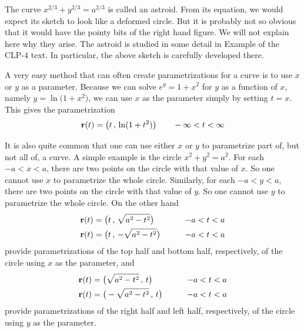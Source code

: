 \begin{eg}[Parametrization of  $\frac{x^2}{a^2}+\frac{y^2}{b^2}=1$ and of
$x^{2/3}+y^{2/3}=a^{2/3}$]
\begin{wfig}
\begin{center}
\end{center}
\end{wfig}
The curve $x^{2/3}+y^{2/3}=a^{2/3}$ is called an astroid. From its equation,
we would expect its sketch to look like a deformed circle. But it is probably 
not so obvious that it would have the pointy bits of the right hand figure.
We will not explain here why they arise. The astroid is studied in some 
detail in Example  of the CLP-4 text.
In particular, the above sketch is carefully developed there.  
 
\end{eg}

\begin{eg}[Parametrization of  $e^y=1+x^2$]\label{eg:paramMessy}
A very easy method that can often create parametrizations for a curve is to use $x$ or $y$ as a parameter. Because we can solve $e^y=1+x^2$ for $y$ as a function of $x$, namely $y=\ln\big(1+x^2\big)$, we can use $x$ as 
the parameter simply by setting $t=x$. This gives the parametrization
\begin{equation*}
\mathbf{r}(t) = \big(t\,,\,\ln(1+t^2)\big)\qquad -\infty<t<\infty
\end{equation*}  
\end{eg}

\begin{eg}[Parametrization of  $x^2+y^2=a^2$, again]\label{eg:paramCircleC}
It is also quite common that one can use either $x$ or $y$ to parametrize part of, but not all of, a curve. A simple example is the circle $x^2+y^2=a^2$.
For each $-a<x<a$, there are two points on the circle with that value of $x$.
So one cannot use $x$ to parametrize the whole circle.
Similarly, for each $-a<y<a$, there are two points on the circle with that value of $y$. So one cannot use $y$ to parametrize the whole circle. On the other 
hand
\begin{alignat*}{3}
\mathbf{r}(t) &= \big(t\,,\,\sqrt{a^2-t^2}\big)\qquad &-a<t<a \\
\mathbf{r}(t) &= \big(t\,,\,-\sqrt{a^2-t^2}\big)\qquad &-a<t<a
\end{alignat*}
provide parametrizations of the top half and bottom half, respectively,
of the circle using $x$ as the parameter, and
\begin{alignat*}{3}
\mathbf{r}(t) &= \big(\sqrt{a^2-t^2}\,,\,t\big)\qquad &-a<t<a \\
\mathbf{r}(t) &= \big(-\sqrt{a^2-t^2}\,,\,t\big)\qquad &-a<t<a
\end{alignat*}
provide parametrizations of the right half and left half, respectively,
of the circle using $y$ as the parameter.
\end{eg}

